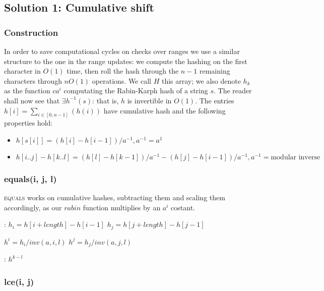 \documentclass{article}
\begin{document}
\subsection{Solution 1: Cumulative shift}
\subsubsection{Construction}

In order to save computational cycles on checks over ranges we use a similar structure
to the one in the range updates: we compute the hashing on the first character in $O(1)$
time, then roll the hash through the $n - 1$ remaining characters through $n O(1)$
operations.
We call $H$ this array; we also denote $h_k$ as the function $c a^{i}$ computating
the Rabin-Karph hash of a string $s$.
The reader shall now see that $\exists h^{-1}(s)$: that is, $h$ is invertible in $O(1)$.
The entries $h[i] = \sum_{i \in [0, n - 1]}(h(i))$ have cumulative hash and the following
properties hold:
    \begin{itemize}
    \item $h[s[i]] = (h[i] - h[i - 1]) / a^{-1}, a^{-1} = a^{1}$
    \item $h[i..j] - h[k..l] = (h[l] - h[k - 1]) / a^{-1} -
            (h[j] - h[i - 1]) / a^{-1}, a^{-1} = \textrm{modular inverse}$
    \end{itemize}

\subsubsection{equals(i, j, l)}

\textsc{equals} works on cumulative hashes, subtracting them and scaling them
accordingly, as our $rabin$ function multiplies by an $a^{i}$ costant.

\begin{algorithmic}[1]
  :
    \State $h_i = h[i + length] - h[i - 1]$\;
    \State $h_j = h[j + length] - h[j - 1]$\;

    \State $h^{i} = h_i / inv(a, i, l)$\;
    \State $h^{j} = h_j / inv(a, j, l)$\;

    \;
    \EndFunction

    :
    \Return $h^{k - l}$
    \EndFunction
\end{algorithmic}

\subsubsection{lce(i, j)}
\end{document}
